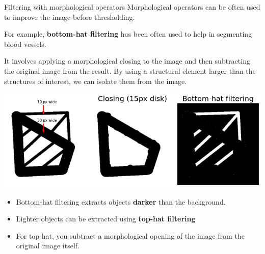 \documentclass[9pt, aspectratio=169]{beamer}
\begin{document}
\begin{frame}
    {Filtering with morphological operators}
    Morphological operators can be often used to improve the image before thresholding.

    For example, \textbf{bottom-hat filtering} has been often used to help in segmenting blood vessels.

    \pause

    It involves applying a morphological closing to the image and then subtracting the original image from the result.
    By using a structural element larger than the structures of interest, we can isolate them from the image.

    \centering
    \includegraphics[width=.7\textwidth]{bh_example.png}

    \pause
    \small
    \begin{itemize}
        \item Bottom-hat filtering extracts objects \textbf{darker} than the background.
        \item Lighter objects can be extracted using \textbf{top-hat filtering}
        \item For top-hat, you subtract a morphological opening of the image from the original image itself.
    \end{itemize}
\end{frame}
\end{document}
